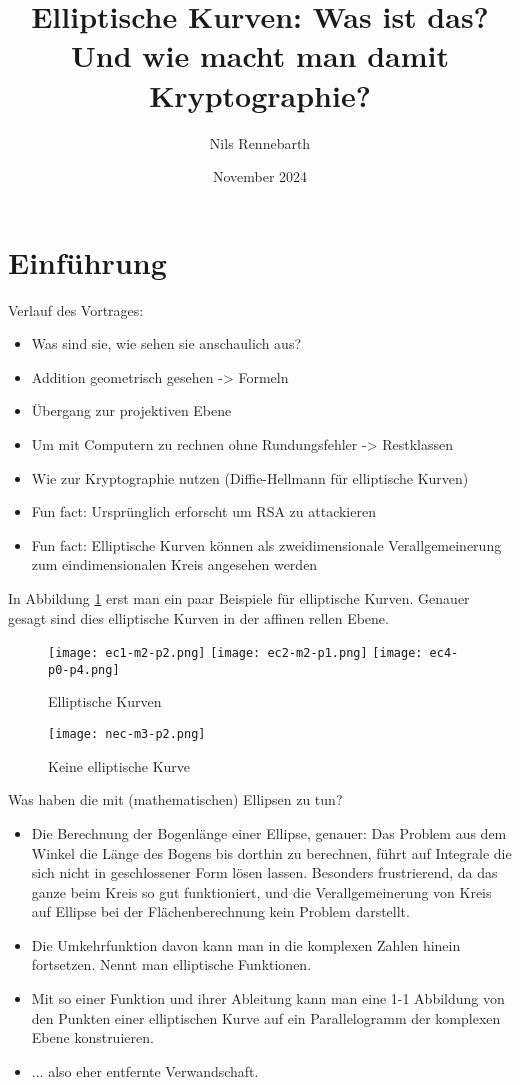 \documentclass{article}
\title{Elliptische Kurven: Was ist das? \\
  Und wie macht man damit Kryptographie?}
\author{Nils Rennebarth}
\date{November 2024}
\begin{document}
\maketitle
\section{Einführung}
Verlauf des Vortrages:

\begin{itemize}
\item
  Was sind sie, wie sehen sie anschaulich aus?
\item
  Addition geometrisch gesehen -> Formeln
\item
  Übergang zur projektiven Ebene
\item
  Um mit Computern zu rechnen ohne Rundungsfehler -> Restklassen
\item
  Wie zur Kryptographie nutzen (Diffie-Hellmann für elliptische Kurven)
\item
  Fun fact: Ursprünglich erforscht um RSA zu attackieren
\item
  Fun fact: Elliptische Kurven können als zweidimensionale
  Verallgemeinerung zum eindimensionalen Kreis angesehen werden
\end{itemize}

In Abbildung \ref{fig:ecurves} erst man ein paar Beispiele für elliptische Kurven.
Genauer gesagt sind dies elliptische Kurven in der affinen rellen Ebene.


\begin{figure}[h]
  \texttt{[image: ec1-m2-p2.png]}
  \texttt{[image: ec2-m2-p1.png]}
  \texttt{[image: ec4-p0-p4.png]}
  
  \caption{Elliptische Kurven}
  \label{fig:ecurves}
\end{figure}

\begin{figure}
  \centering
    \texttt{[image: nec-m3-p2.png]}
  \caption{Keine elliptische Kurve}
  \label{fig:noecurve}
\end{figure}

Was haben die mit (mathematischen) Ellipsen zu tun?

\begin{itemize}
\item
  Die Berechnung der Bogenlänge einer Ellipse, genauer: Das Problem aus dem
  Winkel die Länge des Bogens bis dorthin zu berechnen, führt auf Integrale
  die sich nicht in geschlossener Form lösen lassen. Besonders frustrierend,
  da das ganze beim Kreis so gut funktioniert, und die Verallgemeinerung von
  Kreis auf Ellipse bei der Flächenberechnung kein Problem darstellt.
\item
  Die Umkehrfunktion davon kann man in die komplexen Zahlen hinein
  fortsetzen. Nennt man elliptische Funktionen.
\item
  Mit so einer Funktion und ihrer Ableitung kann man eine 1-1 Abbildung
  von den Punkten einer elliptischen Kurve auf ein Parallelogramm der
  komplexen Ebene konstruieren.
\item
  $\ldots$ also eher entfernte Verwandschaft.
\end{itemize}
\end{document}

